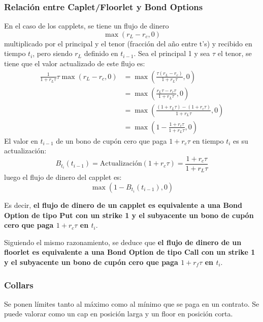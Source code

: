 \subsubsection{Relación entre Caplet/Floorlet y Bond Options}
En el caso de los capplets, se tiene un flujo de dinero
\begin{equation*}
    \max(r_L - r_c, 0)
\end{equation*}
multiplicado por el principal y el tenor (fracción del año entre t's) y recibido en tiempo $t_i$, pero siendo $r_L$ definido en $t_{i-1}$. Sea el principal 1 y sea $\tau$ el tenor, se tiene que el valor actualizado de este flujo es:
\begin{align*}
    \frac{1}{1+r_L\tau}\tau\max(r_L - r_c, 0) &= \max\left(\frac{\tau(r_L - r_c)}{1+r_L\tau}, 0\right) \\
    &= \max\left(\frac{r_L\tau - r_c\tau}{1+r_L\tau}, 0\right) \\
    &= \max\left(\frac{ (1+r_L\tau) - ( 1+r_c\tau) }{1+r_L\tau}, 0\right) \\
    &= \max\left( 1 - \frac{ 1+r_c\tau }{1+r_L\tau}, 0\right)
\end{align*}
El valor en $t_{i-1}$ de un bono de cupón cero que paga $1+r_c\tau$ en tiempo $t_i$ es su actualización:
\begin{equation*}
    B_{t_i}(t_{i-1}) = \text{Actualización}(1+r_c\tau) = \frac{ 1+r_c\tau }{1+r_L\tau}
\end{equation*}
luego el flujo de dinero del capplet es:
\begin{equation*}
    \max\left( 1 - B_{t_i}(t_{i-1}), 0\right)
\end{equation*}

Es decir, \textbf{el flujo de dinero de un capplet es equivalente a una Bond Option de tipo Put con un strike 1 y el subyacente un bono de cupón cero que paga $1+r_c\tau$ en $t_i$}. 

Siguiendo el mismo razonamiento, se deduce que \textbf{el flujo de dinero de un floorlet es equivalente a una Bond Option de tipo Call con un strike 1 y el subyacente un bono de cupón cero que paga $1+r_f\tau$ en $t_i$}.



\subsubsection{Collars}
Se ponen límites tanto al máximo como al mínimo que se paga en un contrato. Se puede valorar como un cap en posición larga y un floor en posición corta.







